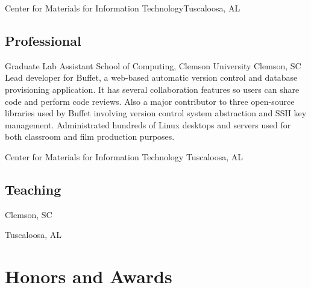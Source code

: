 \documentclass[11pt]{moderncv}
\newif\ifonepage
\begin{document}
        {Center for Materials for Information Technology}{Tuscaloosa, AL}{}{}

\subsection{Professional}

        {Graduate Lab Assistant}
        {School of Computing, Clemson University}
        {Clemson, SC}{}{
  Lead developer for Buffet, a web-based automatic version control and database
  provisioning application. It has several collaboration features so users can
  share code and perform code reviews. Also a major contributor to three
  open-source libraries used by Buffet involving version control system
  abstraction and SSH key management. Administrated hundreds of Linux desktops
  and servers used for both classroom and film production purposes.
}

        {Center for Materials for Information Technology}
        {Tuscaloosa, AL}{}{
}


\subsection{Teaching}

        {Clemson, SC}{}{
}

        {Tuscaloosa, AL}{}{
}

\ifonepage
\else
\section{Honors and Awards}
\end{document}
